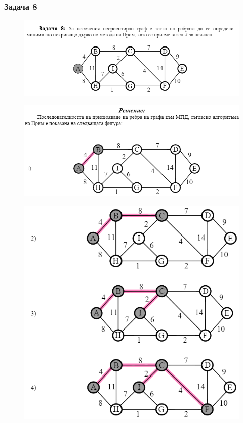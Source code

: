 \documentclass[fleqn, 12pt]{article}
\theoremstyle{definition}
\begin{document}
\subsubsection*{Задача 8}
\begin{figure} [htp!]
\includegraphics{Pics/Discrete math/ex8/ex8-task8.png}
\end{figure}
\begin{figure} [htp!]
\includegraphics{Pics/Discrete math/ex8/ex8-task8-1.png}
\end{figure}
\begin{figure} [htp!]
\includegraphics{Pics/Discrete math/ex8/ex8-task8-2.png}
\end{figure}
\end{document}
